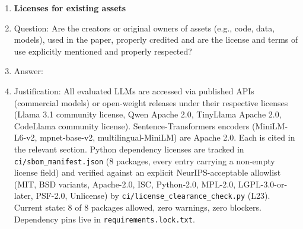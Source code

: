\begin{enumerate}
\item {\bf Licenses for existing assets}
    \item[] Question: Are the creators or original owners of assets (e.g., code, data, models), used in the paper, properly credited and are the license and terms of use explicitly mentioned and properly respected?
    \item[] Answer: \answerYes{}
    \item[] Justification: All evaluated LLMs are accessed via published APIs (commercial models) or open-weight releases under their respective licenses (Llama 3.1 community license, Qwen Apache 2.0, TinyLlama Apache 2.0, CodeLlama community license). Sentence-Transformers encoders (MiniLM-L6-v2, mpnet-base-v2, multilingual-MiniLM) are Apache 2.0. Each is cited in the relevant section. Python dependency licenses are tracked in \texttt{ci/sbom\_manifest.json} (8 packages, every entry carrying a non-empty license field) and verified against an explicit NeurIPS-acceptable allowlist (MIT, BSD variants, Apache-2.0, ISC, Python-2.0, MPL-2.0, LGPL-3.0-or-later, PSF-2.0, Unlicense) by \texttt{ci/license\_clearance\_check.py} (L23). Current state: 8 of 8 packages allowed, zero warnings, zero blockers. Dependency pins live in \texttt{requirements.lock.txt}.


\end{enumerate}
